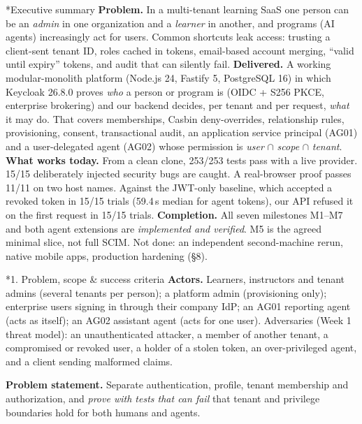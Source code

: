 \documentclass[11pt]{article}
\makeatletter
\renewcommand\section{\@startsection{section}{1}{0pt}{-10pt plus -2pt}{4pt}{\large\bfseries}}
\renewcommand\subsection{\@startsection{subsection}{2}{0pt}{-7pt plus -2pt}{2pt}{\normalsize\bfseries}}
\makeatother
\begin{document}
\subsection*{Executive summary}
\textbf{Problem.} In a multi-tenant learning SaaS one person can be an \emph{admin} in one organization and a \emph{learner} in another, and programs (AI agents) increasingly act for users. Common shortcuts leak access: trusting a client-sent tenant ID, roles cached in tokens, email-based account merging, ``valid until expiry'' tokens, and audit that can silently fail.
\textbf{Delivered.} A working modular-monolith platform (Node.js 24, Fastify 5, PostgreSQL 16) in which Keycloak 26.8.0 proves \emph{who} a person or program is (OIDC + S256 PKCE, enterprise brokering) and our backend decides, per tenant and per request, \emph{what} it may do. That covers memberships, Casbin deny-overrides, relationship rules, provisioning, consent, transactional audit, an application service principal (AG01) and a user-delegated agent (AG02) whose permission is \emph{user} $\cap$ \emph{scope} $\cap$ \emph{tenant}.
\textbf{What works today.} From a clean clone, 253/253 tests pass with a live provider. 15/15 deliberately injected security bugs are caught. A real-browser proof passes 11/11 on two host names. Against the JWT-only baseline, which accepted a revoked token in 15/15 trials (59.4\,s median for agent tokens), our API refused it on the first request in 15/15 trials.
\textbf{Completion.} All seven milestones M1--M7 and both agent extensions are \emph{implemented and verified}. M5 is the agreed minimal slice, not full SCIM. Not done: an independent second-machine rerun, native mobile apps, production hardening (\S8).

\section*{1. Problem, scope \& success criteria}
\textbf{Actors.} Learners, instructors and tenant admins (several tenants per person); a platform admin (provisioning only); enterprise users signing in through their company IdP; an AG01 reporting agent (acts as itself); an AG02 assistant agent (acts for one user). Adversaries (Week 1 threat model): an unauthenticated attacker, a member of another tenant, a compromised or revoked user, a holder of a stolen token, an over-privileged agent, and a client sending malformed claims.

\textbf{Problem statement.} Separate authentication, profile, tenant membership and authorization, and \emph{prove with tests that can fail} that tenant and privilege boundaries hold for both humans and agents.
\end{document}
